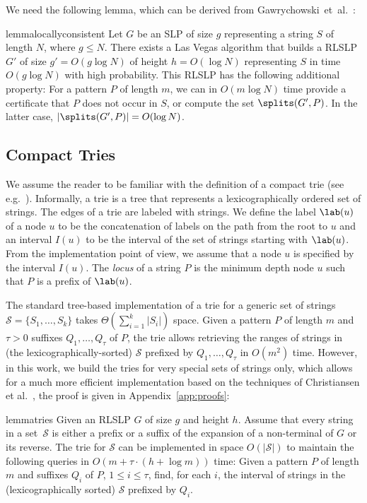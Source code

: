 We need the following lemma, which can be derived from Gawrychowski~et~al.~\cite{soda/GawrychowskiKKL18}:

\begin{restatable}{lemma}{locallyconsistent}\label{lm:locally_consistent}
Let $G$ be an SLP of size $g$ representing a string $S$ of length $N$, where $g \le N$. There exists a Las Vegas algorithm that builds a RLSLP $G'$ of size $g' = O(g \log N)$ of height $h = O(\log N)$ representing $S$ in time $O(g \log N)$ with high probability. This RLSLP has the following additional property: For a pattern $P$ of length $m$, we can in $O(m\log N)$ time provide a certificate that $P$ does not occur in $S$, or compute the set $\splits(G',P)$. In the latter case, $|\splits(G',P)| = O(\log N)$. 
\end{restatable}

\subsection{Compact Tries}
\label{indexgapped:sec:compact_tries}
We assume the reader to be familiar with the definition of a compact trie (see e.g.~\cite{Gusfield1997}). Informally, a trie is a tree that represents a lexicographically ordered set of strings. The edges of a trie are labeled with strings. We define the label $\lab(u)$ of a node $u$ to be the concatenation of labels on the path from the root to $u$ and an interval $I(u)$ to be the interval of the set of strings starting with $\lab(u)$. From the implementation point of view, we assume that a node $u$ is specified by the interval $I(u)$. The \emph{locus} of a string $P$ is the minimum depth node $u$ such that $P$ is a prefix of $\lab(u)$. 

The standard tree-based implementation of a trie for a generic set of strings $\mathcal{S}= \{S_1, \ldots, S_k\}$ takes $\Theta\left(\sum_{i=1}^k |S_i|\right)$ space. Given a pattern $P$ of length $m$ and $\tau > 0$
suffixes $Q_1,\dots,Q_{\tau}$ of $P$, the trie allows retrieving the ranges of strings in (the lexicographically-sorted) $\mathcal{S}$ prefixed by
$Q_1,\dots,Q_{\tau}$ in $O(m^2)$ time. However, in this work, we build the tries for very special sets of strings only, which allows for a much more efficient implementation based on the techniques of Christiansen et al.~\cite{talg/ChristiansenEKN21}, the proof is given in Appendix~\ref{app:proofs}:

\begin{restatable}{lemma}{tries}\label{lm:tries}
Given an RLSLP $G$ of size $g$ and height $h$. Assume that every string in a set~$\mathcal{S}$ is either a prefix or a suffix of the expansion of a non-terminal of $G$ or its reverse. The trie for $\mathcal{S}$ 
can be implemented in space $O(|\mathcal{S}|)$ to maintain the following queries in $O(m + \tau \cdot (h + \log m))$ time: Given a pattern $P$ of length $m$ and suffixes $Q_i$ of $P$, $1 \le i \le \tau$, find, for each $i$, the interval of strings in the (lexicographically sorted) $\mathcal{S}$ prefixed by $Q_i$. 
\end{restatable}


